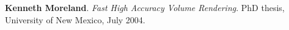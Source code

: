 \begin{enumerate}[label={[\arabic*]}, left=0pt]
\item  %
  \textbf{Kenneth Moreland}.
  \emph{Fast High Accuracy Volume Rendering}.
PhD thesis, University of New Mexico, July 2004.
\end{enumerate}